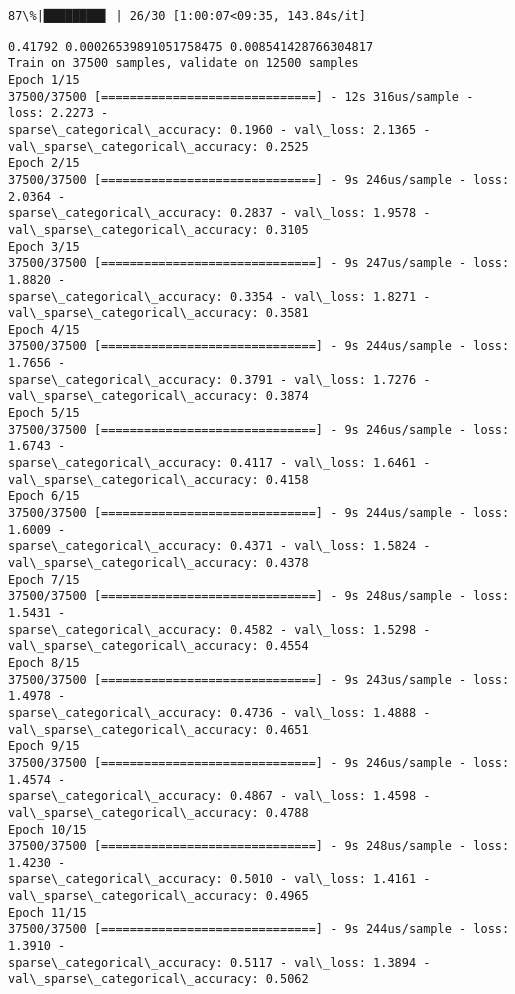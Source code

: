 \documentclass[11pt]{article}
\begin{document}
    \begin{Verbatim}[commandchars=\\\{\}]
 87\%|████████▋ | 26/30 [1:00:07<09:35, 143.84s/it]
    \end{Verbatim}

    \begin{Verbatim}[commandchars=\\\{\}]
0.41792 0.00026539891051758475 0.008541428766304817
Train on 37500 samples, validate on 12500 samples
Epoch 1/15
37500/37500 [==============================] - 12s 316us/sample - loss: 2.2273 -
sparse\_categorical\_accuracy: 0.1960 - val\_loss: 2.1365 -
val\_sparse\_categorical\_accuracy: 0.2525
Epoch 2/15
37500/37500 [==============================] - 9s 246us/sample - loss: 2.0364 -
sparse\_categorical\_accuracy: 0.2837 - val\_loss: 1.9578 -
val\_sparse\_categorical\_accuracy: 0.3105
Epoch 3/15
37500/37500 [==============================] - 9s 247us/sample - loss: 1.8820 -
sparse\_categorical\_accuracy: 0.3354 - val\_loss: 1.8271 -
val\_sparse\_categorical\_accuracy: 0.3581
Epoch 4/15
37500/37500 [==============================] - 9s 244us/sample - loss: 1.7656 -
sparse\_categorical\_accuracy: 0.3791 - val\_loss: 1.7276 -
val\_sparse\_categorical\_accuracy: 0.3874
Epoch 5/15
37500/37500 [==============================] - 9s 246us/sample - loss: 1.6743 -
sparse\_categorical\_accuracy: 0.4117 - val\_loss: 1.6461 -
val\_sparse\_categorical\_accuracy: 0.4158
Epoch 6/15
37500/37500 [==============================] - 9s 244us/sample - loss: 1.6009 -
sparse\_categorical\_accuracy: 0.4371 - val\_loss: 1.5824 -
val\_sparse\_categorical\_accuracy: 0.4378
Epoch 7/15
37500/37500 [==============================] - 9s 248us/sample - loss: 1.5431 -
sparse\_categorical\_accuracy: 0.4582 - val\_loss: 1.5298 -
val\_sparse\_categorical\_accuracy: 0.4554
Epoch 8/15
37500/37500 [==============================] - 9s 243us/sample - loss: 1.4978 -
sparse\_categorical\_accuracy: 0.4736 - val\_loss: 1.4888 -
val\_sparse\_categorical\_accuracy: 0.4651
Epoch 9/15
37500/37500 [==============================] - 9s 246us/sample - loss: 1.4574 -
sparse\_categorical\_accuracy: 0.4867 - val\_loss: 1.4598 -
val\_sparse\_categorical\_accuracy: 0.4788
Epoch 10/15
37500/37500 [==============================] - 9s 248us/sample - loss: 1.4230 -
sparse\_categorical\_accuracy: 0.5010 - val\_loss: 1.4161 -
val\_sparse\_categorical\_accuracy: 0.4965
Epoch 11/15
37500/37500 [==============================] - 9s 244us/sample - loss: 1.3910 -
sparse\_categorical\_accuracy: 0.5117 - val\_loss: 1.3894 -
val\_sparse\_categorical\_accuracy: 0.5062

\end{Verbatim}
\end{document}
